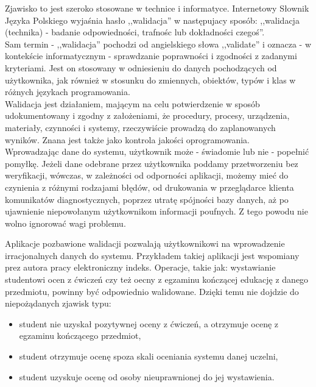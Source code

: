 \documentclass[brudnopis]{xmgr}
\begin{document}
\indent \textcolor{wa}{Zjawisko to jest szeroko stosowane w technice i informatyce. Internetowy Słownik
Języka Polskiego wyjaśnia hasło ,,walidacja'' w następujacy sposób: ,,walidacja
(technika) - badanie odpowiedności, trafnośc lub dokładności czegoś''.}
\\
\indent \textcolor{wa}{Sam termin - ,,walidacja'' pochodzi od angielskiego słowa ,,validate'' i oznacza -
w kontekście informatycznym - sprawdzanie poprawności i zgodności z zadanymi
kryteriami. Jest on stosowany w odniesieniu do danych pochodzących od użytkownika,
jak również w stosunku do zmiennych, obiektów, typów i klas w różnych językach
programowania.}
\\
\indent \textcolor{wa}{Walidacja jest działaniem, mającym na celu potwierdzenie w sposób udokumentowany
i zgodny z założeniami, że procedury, procesy, urządzenia, materiały, czynności
i systemy, rzeczywiście prowadzą do zaplanowanych wyników. Znana jest także jako
kontrola jakości oprogramowania.}
\\
\indent \textcolor{wa}{Wprowadzając dane do systemu, użytkownik może - świadomie lub nie - popełnić
pomyłkę. Jeżeli dane odebrane przez użytkownika poddamy przetworzeniu bez weryfikacji,
wówczas, w zależności od odporności aplikacji, możemy mieć do czynienia z różnymi
rodzajami błędów, od drukowania w przeglądarce klienta komunikatów diagnostycznych,
poprzez utratę spójności bazy danych, aż po ujawnienie niepowołanym użytkownikom
informacji poufnych. Z tego powodu nie wolno ignorować wagi problemu.}
\\
\indent \textcolor{wc}{Aplikacje pozbawione walidacji pozwalają użytkownikowi na wprowadzenie irracjonalnych
danych do systemu. Przykładem takiej aplikacji jest wspomiany prez autora pracy
elektroniczny indeks. Operacje, takie jak: wystawianie studentowi ocen z ćwiczeń
czy też oecny z egzaminu kończącej edukację z danego przedmiotu, powinny być
odpowiednio walidowane. Dzięki temu nie dojdzie do niepożądanych zjawisk typu:
\begin{itemize}
\item student nie uzyskał pozytywnej oceny z ćwiczeń, a otrzymuje ocenę z egzaminu
kończącego przedmiot,
\item student otrzymuje ocenę spoza skali oceniania systemu danej uczelni,
\item student uzyskuje ocenę od osoby nieuprawnionej do jej wystawienia.
\end{itemize}}
\end{document}
